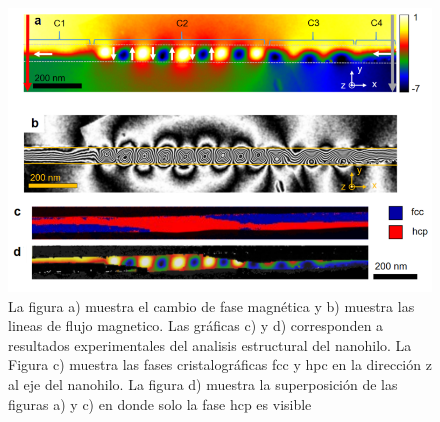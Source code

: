 \begin{figure}[!hpt]
    \centering
    \includegraphics[scale=0.7]{Figuras/ExoticVortexNW.png}
    \caption{La figura a) muestra el cambio de fase magnética y b) muestra las lineas de flujo magnetico. Las gráficas c) y d) corresponden a resultados experimentales del analisis estructural del nanohilo. La Figura c) muestra las fases cristalográficas fcc y hpc en la dirección z al eje del nanohilo. La figura d) muestra la superposición de las figuras a) y c) en donde solo la fase hcp es visible \cite{ExoticMagneticConfiguration}}
    \label{fig:ExoticVortexNW}
\end{figure}